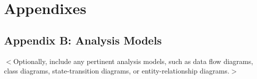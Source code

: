 \documentclass{scrreprt}
\begin{document}
\chapter{Appendixes}

\section{Appendix B: Analysis Models}
$<$Optionally, include any pertinent analysis models, such as data flow 
diagrams, class diagrams, state-transition diagrams, or entity-relationship 
diagrams.$>$
\end{document}
